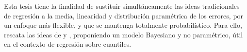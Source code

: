 Esta tesis tiene la finalidad de sustituir simult\'aneamente las ideas tradicionales de regresi\'on a la media, linearidad y distribuci\'on param\'etrica de los errores, por un enfoque m\'as flexible, y que se mantenga totalmente probabil\'istico. Para ello, rescata las ideas de \cite{Kottas_NotParamQuantReg} y \cite{Kottas_SemiparamQuantReg}, proponiendo un modelo Bayesiano y no param\'etrico, \'util en el contexto de regresi\'on sobre cuantiles.

\newpage